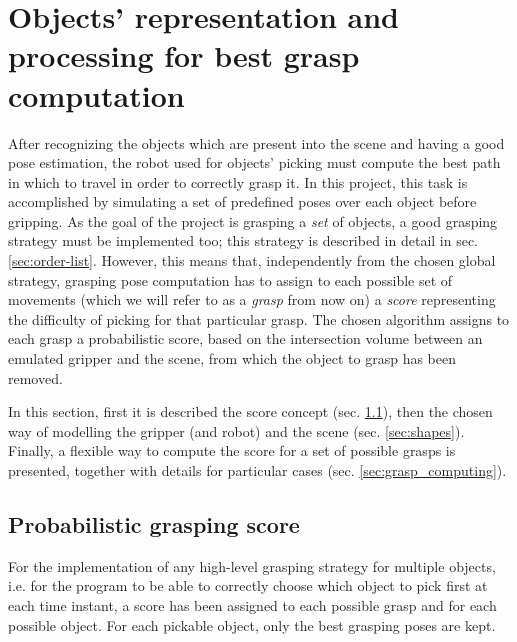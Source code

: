 \section{Objects' representation and processing for best grasp computation}
After recognizing the objects which are present into the scene and having a
good pose estimation, the robot used for objects' picking must compute the best path
in which to travel in order to correctly grasp it. In this project, this task
is accomplished by simulating a set of predefined poses over each object before
gripping. As the goal of the project is grasping a \emph{set} of objects, a
good grasping strategy must be implemented too; this strategy is described in
detail in sec. \ref{sec:order-list}. However, this means that, independently from the
chosen global strategy, grasping pose computation has to assign to each
possible set of movements (which we will refer to as a \emph{grasp} from now on)
a \emph{score} representing the difficulty of picking
for that particular grasp. The chosen algorithm assigns to each grasp a
probabilistic score, based on the intersection volume between an emulated
gripper and the scene, from which the object to grasp has been removed.

In this section, first it is described the score concept (sec.
\ref{sec:grasp_score}), then the chosen way of modelling the gripper (and robot) and
the scene (sec. \ref{sec:shapes}). Finally, a flexible way to compute the score for a set of possible
grasps is presented, together with details for particular cases (sec.
\ref{sec:grasp_computing}).

\subsection{Probabilistic grasping score} \label{sec:grasp_score}
For the implementation of any high-level grasping strategy for multiple
objects, i.e. for the program to be able to correctly choose which object to
pick first at each time instant, a score has been assigned to each possible
grasp and for each possible object. For each pickable object, only the best
grasping poses are kept.

